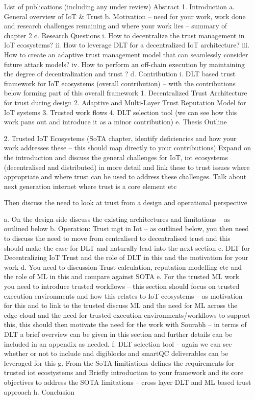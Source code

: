 
List of publications (including any under review)
Abstract 
1.	Introduction  
a.	General overview of IoT & Trust
b.	Motivation – need for your work, work done and research challenges remaining and where your work lies – summary of chapter 2
c.	Research Questions 
i.	How to decentralize the trust management in IoT ecosystems?
ii.	How to leverage DLT for a decentralized IoT architecture? 
iii.	How to create an adaptive trust management model that can seamlessly consider future attack models?
iv.	How to perform an off-chain execution by maintaining the degree of decentralization and trust ? 
d.	Contribution
i.	DLT based trust framework for IoT ecosystems (overall contribution) – with the contributions below forming part of this overall framework
1.	Decentralized Trust Architecture for trust during design 
2.	Adaptive and Multi-Layer Trust Reputation Model for IoT systems
3.	Trusted work flows 
4.	DLT selection tool (we can see how this work pans out and introduce it as a minor contribution)
e.	Thesis Outline




2.	Trusted IoT Ecosystems
 (SoTA chapter, identify deficiencies and how your work addresses these – this should map directly to your contributions)
Expand on the introduction and discuss the general challenges for IoT, iot ecosystems (decentralised and distributed) in more detail and link these to trust issues where appropriate and where trust can be used to address these challenges. Talk about next generation internet where trust is a core element etc


Then discuss the need to look at trust from a design and operational perspective  

a.	On the design side discuss the existing architectures and limitations – as outlined below
b.	Operation: Trust mgt in Iot – as outlined below, you then need to discuss the need to move from centralised to decentralised trust and this should make the case for DLT and naturally lead into the next section 
c.	DLT for Decentralizing IoT Trust and the role of DLT in this and the motivation for your work 
d.	You need to discussion Trust calculation, reputation modelling etc and the role of ML in this and compare against SOTA 
e.	For the trusted ML work you need to introduce trusted workflows – this section should focus on trusted execution environments and how this relates to IoT ecosystems – as motivation for this and to link to the trusted discuss ML and the need for ML across the edge-cloud and the need for trusted execution environments/workflows to support this, this should  then motivate the need for the work with Sourabh – in terms of DLT a brief overview can be given in this section and further details can be included in an appendix as needed. 
f.	DLT selection tool – again we can see whether or not to include and digiblocks and smartQC deliverables can be leveraged for this
g.	From the SoTA limitiations defines the requirements for trusted iot ecostystems and Briefly introduction to your framework and its core objectives to address the SOTA limitations – cross layer DLT and ML based trust approach 
h.	Conclusion  



